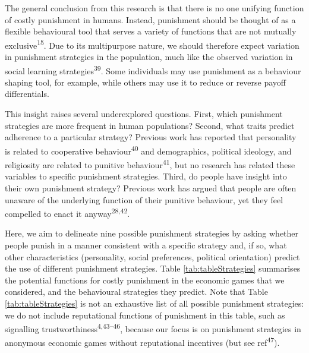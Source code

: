 \documentclass[
  man,floatsintext]{apa6}
\begin{document}
The general conclusion from this research is that there is no one unifying
function of costly punishment in humans. Instead, punishment should be thought
of as a flexible behavioural tool that serves a variety of functions that are
not mutually exclusive\textsuperscript{15}. Due to its multipurpose nature, we should
therefore expect variation in punishment strategies in the population, much like
the observed variation in social learning strategies\textsuperscript{39}. Some
individuals may use punishment as a behaviour shaping tool, for example, while
others may use it to reduce or reverse payoff differentials.

This insight raises several underexplored questions. First, which punishment
strategies are more frequent in human populations? Second, what traits predict
adherence to a particular strategy? Previous work has reported that personality
is related to cooperative behaviour\textsuperscript{40} and demographics, political
ideology, and religiosity are related to punitive behaviour\textsuperscript{41}, but
no research has related these variables to specific punishment strategies.
Third, do people have insight into their own punishment strategy? Previous work
has argued that people are often unaware of the underlying function of their
punitive behaviour, yet they feel compelled to enact it anyway\textsuperscript{28,42}.

Here, we aim to delineate nine possible punishment strategies by asking
whether people punish in a manner consistent with a specific strategy and, if
so, what other characteristics (personality, social preferences, political
orientation) predict the use of different punishment strategies. Table
\ref{tab:tableStrategies} summarises the potential functions for costly
punishment in the economic games that we considered, and the behavioural
strategies they predict. Note that Table \ref{tab:tableStrategies} is not
an exhaustive list of all possible punishment strategies: we do not include
reputational functions of punishment in this table, such as signalling
trustworthiness\textsuperscript{4,43--46},
because our focus is on punishment strategies in anonymous economic games without
reputational incentives (but see ref\textsuperscript{47}).
\end{document}
